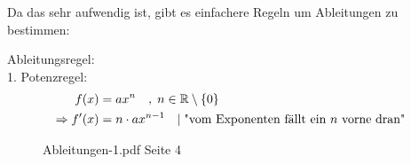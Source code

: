 Da das sehr aufwendig ist, gibt es einfachere Regeln um Ableitungen zu bestimmen:

Ableitungsregel:\\
1. Potenzregel:
\begin{align}
    f(x) &= ax^n \quad,\; n \in \mathbb{R}\setminus\{0\}\\ %
    \Rightarrow f'(x) &= n \cdot ax^{n-1} \mcomm \text{"vom Exponenten fällt ein \(n\) vorne dran"}
\end{align}

\begin{figure}[H]
    \centering
    \label{figEmpty}
    \caption{Ableitungen-1.pdf Seite 4}
\end{figure}


